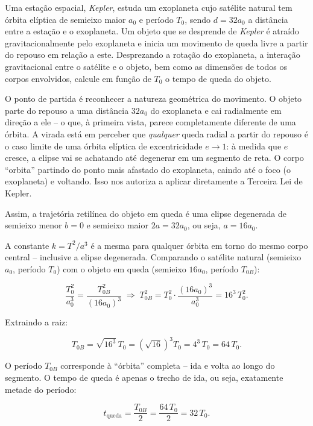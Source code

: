 \vspace{0.3cm}


\begin{exemplo}\label{exemplo_gravitacao_velocidadedeescapeex05}

Uma estação espacial, \textit{Kepler}, estuda um exoplaneta cujo satélite natural tem órbita elíptica de semieixo maior $a_0$ e período $T_0$, sendo $d = 32a_0$ a distância entre a estação e o exoplaneta. Um objeto que se desprende de \textit{Kepler} é atraído gravitacionalmente pelo exoplaneta e inicia um movimento de queda livre a partir do repouso em relação a este. Desprezando a rotação do exoplaneta, a interação gravitacional entre o satélite e o objeto, bem como as dimensões de todos os corpos envolvidos, calcule em função de $T_0$ o tempo de queda do objeto.

\resolucao

O ponto de partida é reconhecer a natureza geométrica do movimento. O
objeto parte do repouso a uma distância $32a_0$ do exoplaneta e cai
radialmente em direção a ele -- o que, à primeira vista, parece
completamente diferente de uma órbita. A virada está em perceber que
\emph{qualquer} queda radial a partir do repouso é o caso limite de uma
órbita elíptica de excentricidade $e \to 1$: à medida que $e$ cresce, a
elipse vai se achatando até degenerar em um segmento de reta. O corpo
``orbita'' partindo do ponto mais afastado do exoplaneta, caindo até o foco (o exoplaneta) e
voltando. Isso nos autoriza a aplicar diretamente a
Terceira Lei de Kepler.

\medskip 

Assim, a trajetória retilínea do objeto em queda é uma elipse degenerada de semieixo menor $b=0$ e semieixo maior $2a=32a_0$, ou seja, $a = 16a_0.$

A constante
$k = T^2 / a^3$ é a mesma para qualquer órbita em torno do mesmo corpo
central -- inclusive a elipse degenerada. Comparando o satélite natural
(semieixo $a_0$, período $T_0$) com o objeto em queda (semieixo
$16a_0$, período $T_{0B}$):

$$\frac{T_0^2}{a_0^3} = \frac{T_{0B}^2}{\left(16a_0\right)^3}
\;\Longrightarrow\;
T_{0B}^2 = T_0^2 \cdot \frac{(16a_0)^3}{a_0^3} = 16^3\, T_0^2.$$

Extraindo a raiz:

$$T_{0B} = \sqrt{16^3}\, T_0 = \left(\sqrt{16}\right)^3 T_0
= 4^3\, T_0 = 64\, T_0.$$

\medskip 

O período $T_{0B}$ corresponde à
``órbita'' completa -- ida e volta ao longo do segmento. O tempo de
queda é apenas o trecho de ida, ou seja, exatamente metade do período:

$$t_\text{queda} = \frac{T_{0B}}{2} = \frac{64\,T_0}{2} =
\boxed{32\,T_0.}$$

\end{exemplo}